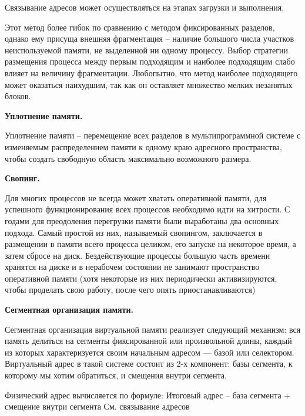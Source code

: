 Связывание адресов может осуществляться на этапах загрузки и выполнения.

Этот метод более гибок по сравнению с методом фиксированных разделов, однако ему присуща внешняя фрагментация – наличие большого числа участков неиспользуемой памяти, не выделенной ни одному процессу. Выбор стратегии размещения процесса между первым подходящим и наиболее подходящим слабо влияет на величину фрагментации. Любопытно, что метод наиболее подходящего может оказаться наихудшим, так как он оставляет множество мелких незанятых блоков.

\begin{center}{\bfseries Уплотнение памяти.}
\end{center}

\begin{opr}
  Уплотнение памяти – перемещение всех разделов в мультипрограммной системе с изменяемым распределением памяти к одному краю адресного пространства, чтобы создать свободную область максимально возможного размера.
\end{opr}

\begin{center}{\bfseries Свопинг.}
\end{center}

Для многих процессов не всегда может хватать оперативной памяти, для успешного функционирования всех процессов необходимо идти на хитрости. С годами для преодоления перегрузки памяти были выработаны два основных подхода. Самый простой из них, называемый свопингом, заключается в размещении в памяти всего процесса целиком, его запуске на некоторое время, а затем сбросе на диск. Бездействующие процессы большую часть времени хранятся на диске и в нерабочем состоянии не занимают пространство оперативной памяти (хотя некоторые из них периодически активизируются, чтобы проделать свою работу, после чего опять приостанавливаются)

\begin{center}{\bfseries Сегментная организация памяти.}
\end{center}

Сегментная организация виртуальной памяти реализует следующий механизм: вся память делиться на сегменты фиксированной или произвольной длины, каждый из которых характеризуется своим начальным адресом — базой или селектором. Виртуальный адрес в такой системе состоит из 2-х компонент: базы сегмента, к которому мы хотим обратиться, и смещения внутри сегмента. 

\begin{utv}
  Физический адрес вычисляется по формуле:
Итоговый адрес – база сегмента + смещение внутри сегмента
См. связывание адресов
\end{utv}

